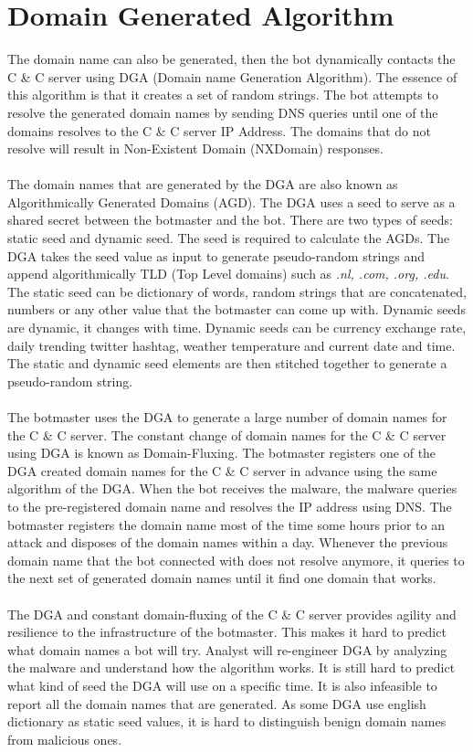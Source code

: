\section{Domain Generated Algorithm}
The domain name can also be generated, then the bot dynamically contacts the C \& C server using DGA (Domain name Generation Algorithm).  The essence of this algorithm is that it creates a set of random strings. The bot attempts to resolve the generated domain names by sending DNS queries until one of the domains resolves to the C \& C server IP Address. The domains that do not resolve will result in Non-Existent Domain (NXDomain) responses.\\\\ The domain names that are generated by the DGA are also known as Algorithmically Generated Domains (AGD).  The DGA uses a seed to serve as a shared secret between the botmaster and the bot. There are two types of seeds: static seed and dynamic seed. The seed is required to calculate the AGDs. The DGA takes the seed value as input to generate pseudo-random strings and append algorithmically TLD (Top Level domains) such as \textit{.nl, .com, .org, .edu}. The static seed can be dictionary of words, random strings that are concatenated, numbers or any other value that the botmaster can come up with. Dynamic seeds are dynamic, it changes with time. Dynamic seeds can be currency exchange rate, daily trending twitter hashtag, weather temperature and current date and time.  The static and dynamic seed elements are then stitched together to generate a pseudo-random string.\\\\ The botmaster uses the DGA to generate a large number of domain names for the C \& C server.  The constant change of domain names for the C \& C server using DGA is known as Domain-Fluxing.  The botmaster registers one of the DGA created domain names for the C \& C server in advance using the same algorithm of the DGA.  When the bot receives the malware, the malware queries to the pre-registered domain name and resolves the IP address using DNS.  The botmaster registers the domain name most of the time some hours prior to an attack and disposes of the domain names within a day.  Whenever the previous domain name that the bot connected with does not resolve anymore, it queries to the next set of generated domain names until it find one domain that works.\\\\ The DGA and constant domain-fluxing of the C \& C server provides agility and resilience to the infrastructure of the botmaster.  This makes it hard to predict what domain names a bot will try. Analyst will re-engineer DGA by analyzing the malware and understand how the algorithm works. It is still hard to predict what kind of seed the DGA will use on a specific time. It is also infeasible to report all the domain names that are generated. As some DGA use english dictionary as static seed values, it is hard to distinguish benign domain names from malicious ones.  
